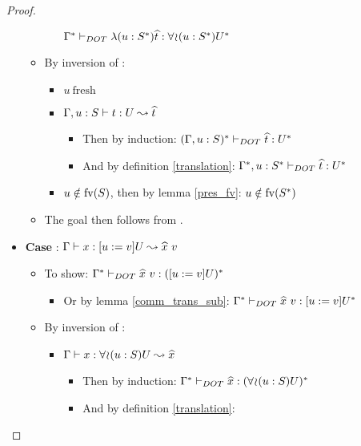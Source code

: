 \begin{proof}
\begin{itemize}
\begin{itemize}
\begin{itemize}
                    $\Gamma^{*} \vdash_{DOT} \lambda(u:S^{*})\widehat{t}: \forall\!\wr\!(u:S^{*})U^{*}$
            \end{itemize}
            \item By inversion of :
            \begin{itemize}
                \item $u\ \text{fresh}$
                \item $\Gamma, u: S \vdash t: U \leadsto \widehat{t}$
                \begin{itemize}
                    \item Then by induction:
                        $(\Gamma, u: S)^{*} \vdash_{DOT} \widehat{t}: U^{*}$
                    \item And by definition \ref{translation}:
                        $\Gamma^{*}, u: S^{*} \vdash_{DOT} \widehat{t}: U^{*}$
                \end{itemize}
                \item $u \notin \text{fv}(S)$, then by lemma \ref{pres_fv}: $u \notin
                    \text{fv}(S^{*})$
            \end{itemize}
            \item The goal then follows from .
        \end{itemize}
        \item \textbf{Case} :
            $\Gamma \vdash x: [u := v]U \leadsto \widehat{x}\ v$
        \begin{itemize}
            \item To show:
                $\TJT{\TRANS{\Gamma}}{\HAT{x}\ v}{\TRANS{(\SUB{u}{v}U)}}$
            \begin{itemize}
                \item Or by lemma \ref{comm_trans_sub}:
                    $\TJT{\TRANS{\Gamma}}{\HAT{x}\ v}{\SUB{u}{v}\TRANS{U}}$
            \end{itemize}
            \item By inversion of :
            \begin{itemize}
                \item $\Gamma \vdash x: \forall\!\wr\!(u:S)U \leadsto \widehat{x}$
                \begin{itemize}
                    \item Then by induction:
                        $\Gamma^{*} \vdash_{DOT} \widehat{x}: (\forall\!\wr\!(u:S)U)^{*}$
                    \item And by definition \ref{translation}:

\end{itemize}
\end{itemize}
\end{itemize}
\end{itemize}
\end{proof}
